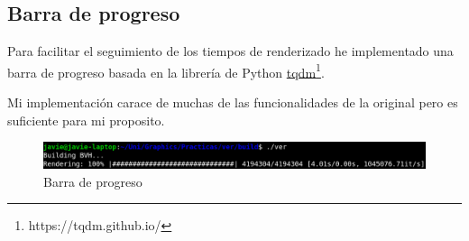 \documentclass{article}
\begin{document}
\subsection{Barra de progreso}
Para facilitar el seguimiento de los tiempos de renderizado he implementado una
barra de progreso basada en la librería de Python
\href{https://tqdm.github.io/}{tqdm}\footnote{https://tqdm.github.io/}.

Mi implementación carace de muchas de las funcionalidades de la original pero es
suficiente para mi proposito.

\begin{figure}[h]
  \centering \includegraphics[width=1\textwidth]{imgs/lwpb.png}
  \caption{Barra de progreso}
\end{figure}

\medskip

\printbibliography
\end{document}
